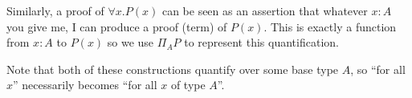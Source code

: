 Similarly, a proof of $\forall x. P(x)$ can be seen as an assertion that
whatever $x:A$ you give me, I can produce a proof (term) of $P(x)$. This is
exactly a function from $x:A$ to $P(x)$ so we use $\Pi_A P$ to represent this
quantification.

Note that both of these constructions quantify over some base type $A$, so ``for
all $x$'' necessarily becomes ``for all $x$ of type $A$''.